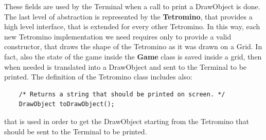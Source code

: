 \documentclass{article}
\begin{document}
These fields are used by the Terminal when a call to print a DrawObject is done.
The last level of abstraction is represented by the \textbf{Tetromino}, that provides a high level interface, that is extended for every other Tetromino. In this way, each new Tetromino implementation we need requires only to provide a valid constructor, that draws the shape of the Tetromino as it was drawn on a Grid.
In fact, also the state of the game inside the \textbf{Game} class is saved inside a grid, then when needed is translated into a DrawObject and sent to the Terminal to be printed.
The definition of the Tetromino class includes also:
\begin{verbatim}
    /* Returns a string that should be printed on screen. */
    DrawObject toDrawObject();
\end{verbatim}
that is used in order to get the DrawObject starting from the Tetromino that should be sent to the Terminal to be printed.
\end{document}
